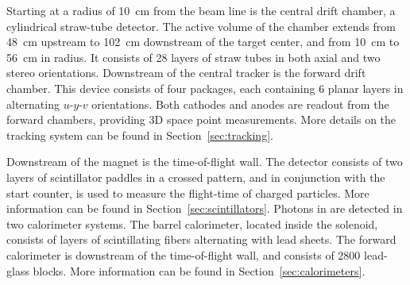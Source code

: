 


Starting at a radius of 10~cm from the beam line is the central drift chamber, a cylindrical straw-tube detector. The active volume of the chamber extends from 48~cm upstream to 102~cm downstream of the target center, and from 10~cm to 56~cm in radius. It consists of 28 layers of straw tubes in both axial and two stereo orientations. Downstream of the central tracker is the forward drift chamber. This device consists of four packages, each containing 6 planar layers in alternating $u$-$y$-$v$ orientations. Both cathodes and anodes are readout from the forward chambers, providing 3D space point measurements. More details on the tracking system can be found in Section~\ref{sec:tracking}. 

Downstream of the magnet is the time-of-flight wall. The detector consists of two layers of scintillator paddles in a crossed pattern, and in conjunction with the start counter, is used to measure the flight-time of charged particles. More information can be found in Section~\ref{sec:scintillators}. 
Photons in \gx{} are detected in two calorimeter systems. The barrel calorimeter, located inside the solenoid, consists of layers of scintillating fibers alternating with lead sheets. The forward calorimeter is downstream of the time-of-flight wall, and consists of $2800$ lead-glass blocks. More information can be found in Section~\ref{sec:calorimeters}.

